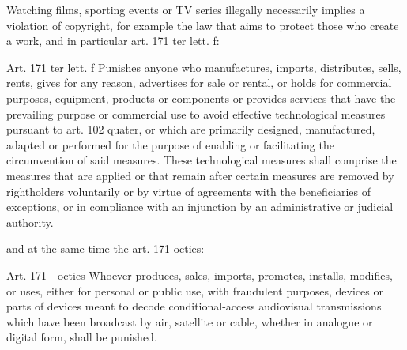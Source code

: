 \documentclass{article}
\begin{document}
\hfill \break
Watching films, sporting events or TV series illegally necessarily implies a violation of 
copyright, for example the law that aims to protect those who create a work, and in particular 
art. 171 ter lett. f: 
\begin{my theorem}{Art. 171 ter lett. f}
  Punishes anyone who manufactures, imports, distributes, sells, rents, 
  gives for any reason, advertises for sale or rental, or holds for commercial purposes, equipment, 
  products or components or provides services that have the prevailing purpose or commercial use to 
  avoid effective technological measures pursuant to art. 102 quater, or which are primarily designed,
  manufactured, adapted or performed for the purpose of enabling or facilitating the circumvention 
  of said measures. These technological measures shall comprise the measures that are applied or 
  that remain after certain measures are removed by rightholders voluntarily or by virtue of 
  agreements with the beneficiaries of exceptions, or in compliance with an injunction by 
  an administrative or judicial authority.
\end{my theorem}

and at the same time the art. 171-octies:
\begin{my theorem}{Art. 171 - octies}
  Whoever produces, sales, imports, promotes, installs, modifies, or uses, either 
  for personal or public use, with fraudulent purposes, devices or parts of devices 
  meant to decode conditional-access audiovisual transmissions which have been broadcast 
  by air, satellite or cable, whether in analogue or digital form, shall be punished.
\end{my theorem}
\end{document}
